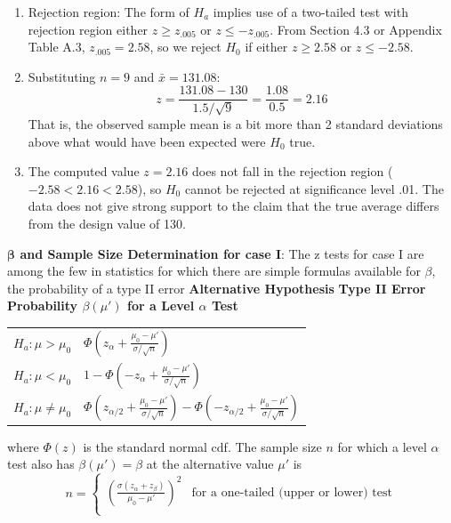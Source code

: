 \documentclass{report}
\begin{document}
\begin{itemize}
\begin{enumerate}
        \item Rejection region: The form of \( H_a \) implies use of a two-tailed test with rejection region either \( z \geq z_{.005} \) or \( z \leq -z_{.005} \). From Section 4.3 or Appendix Table A.3, \( z_{.005} = 2.58 \), so we reject \( H_0 \) if either \( z \geq 2.58 \) or \( z \leq -2.58 \).
        \item Substituting \( n = 9 \) and \( \bar{x} = 131.08 \):
            \[
                z = \frac{131.08 - 130}{1.5 / \sqrt{9}} = \frac{1.08}{0.5} = 2.16
            \]
            That is, the observed sample mean is a bit more than 2 standard deviations above what would have been expected were \( H_0 \) true.
        \item The computed value \( z = 2.16 \) does not fall in the rejection region (\(-2.58 < 2.16 < 2.58\)), so \( H_0 \) cannot be rejected at significance level .01. The data does not give strong support to the claim that the true average differs from the design value of 130.
    \end{enumerate}
    \bigbreak \noindent 
    \textbf{$\mathbf{\beta}$ and Sample Size Determination for case I}: The z tests for case I are among the few in statistics for which there are simple formulas available for $\beta$, the probability of a type II error
    \bigbreak \noindent 
    \noindent
    \textbf{Alternative Hypothesis} \hspace{0.5cm} \textbf{Type II Error Probability \( \beta(\mu') \) for a Level \( \alpha \) Test}
    \bigbreak \noindent 
    \begin{tabular}{>{\bfseries}l l}
        $H_a: \mu > \mu_0$ & $\Phi \left( z_\alpha + \frac{\mu_0 - \mu'}{\sigma / \sqrt{n}} \right)$ \\
        $H_a: \mu < \mu_0$ & $1 - \Phi \left( -z_\alpha + \frac{\mu_0 - \mu'}{\sigma / \sqrt{n}} \right)$ \\
        $H_a: \mu \neq \mu_0$ & $\Phi \left( z_{\alpha/2} + \frac{\mu_0 - \mu'}{\sigma / \sqrt{n}} \right) - \Phi \left( -z_{\alpha/2} + \frac{\mu_0 - \mu'}{\sigma / \sqrt{n}} \right)$ \\
    \end{tabular}
    \bigbreak \noindent 
    where \( \Phi(z) \) is the standard normal cdf.
    \bigbreak \noindent 
    The sample size \( n \) for which a level \( \alpha \) test also has \( \beta(\mu') = \beta \) at the alternative value \( \mu' \) is
    \[
        n = 
        \begin{cases} 
            \left( \frac{\sigma (z_\alpha + z_\beta)}{\mu_0 - \mu'} \right)^2 & \text{for a one-tailed (upper or lower) test} \\ 

\end{cases}\]
\end{itemize}
\end{document}
